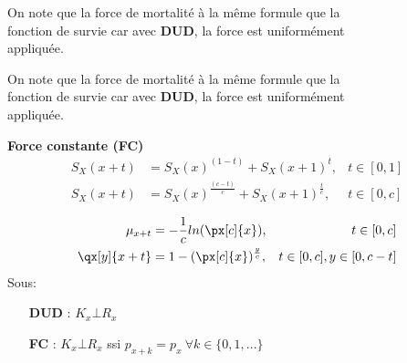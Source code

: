 \documentclass[10pt, french]{article}
\begin{document}
\begin{multicols*}{3}
On note que la force de mortalité à la même formule que la \\ fonction de survie car avec \textbf{DUD}, la force est uniformément \\ appliquée.

On note que la force de mortalité à la même formule que la \\ fonction de survie car avec \textbf{DUD}, la force est uniformément \\ appliquée.

\textbf{Force constante (FC)}
\begin{align*}
S_X(x + t) &= S_X(x)^{(1 - t)} + S_X(x + 1)^t,  &t \in [0, 1] \\
S_X(x + t) &= S_X(x)^{\frac{(c - t)}{c}} + S_X(x + 1)^{\frac{t}{c}},  &t \in [0, c] \\
\end{align*}
\begin{align*}
\mu_{x + t} &= -\frac{1}{c}ln(\px[c]{x}), & t \in[0, c] \\
\qx[y]{x + t} &= 1 - (\px[c]{x})^{\frac{y}{c}}, & t \in[0, c],  y \in [0, c - t] \\
\end{align*}
Sous: 
\begin{enumerate}
	\item[\textbf{DUD} : ] $K_x \bot R_x$
	\item[\textbf{FC} : ] $K_x \bot R_x$ ssi $p_{x + k} = p_{x} \ \forall k \in \{0, 1, ... \}$
\end{enumerate}


\end{multicols*}
\end{document}
